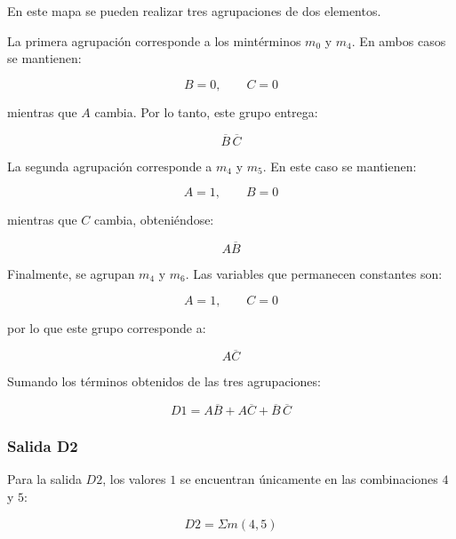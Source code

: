\documentclass[12pt]{report}
\begin{document}
En este mapa se pueden realizar tres agrupaciones de dos elementos.

La primera agrupación corresponde a los mintérminos $m_0$ y $m_4$. En ambos casos
se mantienen:

\begin{equation}
    B=0,
    \qquad
    C=0
\end{equation}

mientras que $A$ cambia. Por lo tanto, este grupo entrega:

\begin{equation}
    \overline{B}\,\overline{C}
\end{equation}

La segunda agrupación corresponde a $m_4$ y $m_5$. En este caso se mantienen:

\begin{equation}
    A=1,
    \qquad
    B=0
\end{equation}

mientras que $C$ cambia, obteniéndose:

\begin{equation}
    A\overline{B}
\end{equation}

Finalmente, se agrupan $m_4$ y $m_6$. Las variables que permanecen constantes son:

\begin{equation}
    A=1,
    \qquad
    C=0
\end{equation}

por lo que este grupo corresponde a:

\begin{equation}
    A\overline{C}
\end{equation}

Sumando los términos obtenidos de las tres agrupaciones:

\begin{equation}
    \boxed{
    D1 =
    A\overline{B}
    + A\overline{C}
    + \overline{B}\,\overline{C}
    }
\end{equation}


\subsubsection{Salida D2}

Para la salida $D2$, los valores $1$ se encuentran únicamente en las combinaciones
$4$ y $5$:

\begin{equation}
    D2 = \Sigma m(4,5)
\end{equation}
\end{document}

